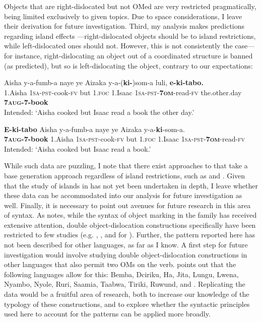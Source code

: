 \documentclass[output=paper
,newtxmath
,modfonts
,nonflat]{langsci/langscibook}
\begin{document}
Objects that are right-dislocated but not OMed are very restricted pragmatically, being limited exclusively to given topics. Due to space considerations, I leave their derivation for future investigation. Third, my analysis makes predictions regarding island effects \citep{Boeckx2012}—right-dislocated objects should be  to island restrictions, while left-dislocated ones should not. However, this is not consistently the case—for instance, right-dislocating an object out of a coordinated structure is banned (as predicted), but so is left-dislocating the object, contrary to our expectations:

\ea\label{ex:ranero:43}
\gll *Aisha  y-a-fumb-a          naye ye      Aizaka  y-a-(\textbf{ki-})som-a            luli,              \textbf{e-ki-tabo.} \\
1.Aisha \textsc{1sa-pst}{}-cook-\textsc{fv} but   1.\textsc{foc} 1.Isaac  \textsc{1sa-pst}{}-\textbf{\textsc{7om}}{}-read-\textsc{fv} the.other.day \textbf{7\textsc{aug}}\textbf{{}-7-book}\\
\glt Intended: ‘Aisha cooked but Isaac read a book the other day.’
\z

\ea\label{ex:ranero:44}
\gll *\textbf{E-ki-tabo}     Aisha    y-a-fumb-a   naye ye       Aizaka y-a-\textbf{ki}{}-som-a.\\
\textbf{7\textsc{aug}}\textbf{{}-7-book} 1.Aisha \textsc{1sa-pst}{}-cook\textsc{{}-fv} but   1.\textsc{foc} 1.Isaac \textsc{1sa-pst}{}-\textbf{7\textsc{om}}{}-read-\textsc{fv}\\
\glt Intended: ‘Aisha cooked but Isaac read a book.’
\z

\textup{While such data are puzzling, I note that there exist approaches to  that take a base generation approach regardless of island restrictions, such as \citet{Cinque1990} and \citet{iatridou1995}. Given that the study of islands in  has not yet been undertaken in depth, I leave whether these data can be accommodated into our analysis for future investigation as well. Finally, it is necessary to point out avenues for future research in this area of  syntax. As \citet{Zeller2015} notes, while the syntax of object marking in the family has received extensive attention, double object-dislocation constructions specifically have been restricted to few studies (e.g. \citealt{Adams2010}, \citealt{zeller2009}, and \citealt{Zeller2015} for ). Further, the pattern reported here has not been described for other  languages, as far as I know. A first step for future investigation would involve studying double object-dislocation constructions in other  languages that also permit two OMs on the verb. \citet{Marlo2015} points out that the following languages allow for this: Bemba, Dciriku, Ha, Jita, Lungu, Lwena, Nyambo, Nyole, Ruri, Saamia, Taabwa, Tiriki, Ruwund, and . Replicating the  data would be a fruitful area of research, both to increase our knowledge of the typology of these constructions, and to explore whether the syntactic principles used here to account for the  patterns can be applied more broadly.}
\end{document}
